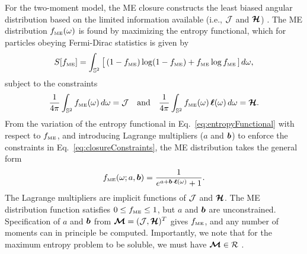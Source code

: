 For the two-moment model, the ME closure constructs the least biased angular distribution based on the limited information available (i.e., $\mathcal{J}$ and $\boldsymbol{\mathcal{H}}$) \cite{cernohorskyBludman_1994,lareckiBanach_2011}.  
The ME distribution $f_{\mbox{\tiny ME}}(\omega)$ is found by maximizing the entropy functional, which for particles obeying Fermi-Dirac statistics is given by
\begin{equation}
  S[f_{\mbox{\tiny ME}}] 
  = \int_{\mathbb{S}^{2}}\big[\,(1-f_{\mbox{\tiny ME}})\log(1-f_{\mbox{\tiny ME}}) + f_{\mbox{\tiny ME}}\log f_{\mbox{\tiny ME}}\,]\,d\omega,
  \label{eq:entropyFunctional}
\end{equation} 
subject to the constraints
\begin{equation}
  \frac{1}{4\pi}\int_{\mathbb{S}^{2}}f_{\mbox{\tiny ME}}(\omega)\,d\omega=\mathcal{J}
  \quad\text{and}\quad
  \frac{1}{4\pi}\int_{\mathbb{S}^{2}}f_{\mbox{\tiny ME}}(\omega)\,\boldsymbol{\ell}(\omega)\,d\omega=\boldsymbol{\mathcal{H}}.  
  \label{eq:closureConstraints}
\end{equation}
From the variation of the entropy functional in Eq.~\eqref{eq:entropyFunctional} with respect to $f_{\mbox{\tiny ME}}$, and introducing Lagrange multipliers ($a$ and $\boldsymbol{b}$) to enforce the constraints in Eq.~\eqref{eq:closureConstraints}, the ME distribution takes the general form
\begin{equation}
  f_{\mbox{\tiny ME}}(\omega;a,\boldsymbol{b})=\frac{1}{e^{a + \boldsymbol{b}\cdot\boldsymbol{\ell}(\omega)}+1}.  
  \label{eq:fME}
\end{equation}
The Lagrange multipliers are implicit functions of $\mathcal{J}$ and $\boldsymbol{\mathcal{H}}$.  
The ME distribution function satisfies $0 \le f_{\mbox{\tiny ME}} \le 1$, but $a$ and $\boldsymbol{b}$ are unconstrained.  
Specification of $a$ and $\boldsymbol{b}$ from $\boldsymbol{\mathcal{M}}=(\mathcal{J},\boldsymbol{\mathcal{H}})^{T}$ gives $f_{\mbox{\tiny ME}}$, and any number of moments can in principle be computed.  
Importantly, we note that for the maximum entropy problem to be soluble, we must have $\boldsymbol{\mathcal{M}}\in\mathcal{R}$ \cite{lareckiBanach_2011}.  

